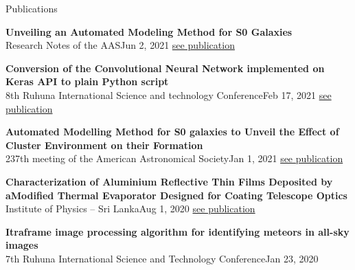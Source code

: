 \documentclass[
	11pt, %
]{./assets/resume} %
\begin{document}





\begin{rSection}{Publications}

	\textbf{Unveiling an Automated Modeling Method for S0 Galaxies} \\
	{Research Notes of the AAS}{Jun 2, 2021}
	\href{https://iopscience.iop.org/article/10.3847/2515-5172/ac0dc0}{see publication}

	\textbf{Conversion of the Convolutional Neural Network implemented on Keras API to plain Python script} \\
	{8th Ruhuna International Science and technology Conference}{Feb 17, 2021}
	\href{https://www.researchgate.net/publication/360994589_Conversion_of_the_Convolutional_Neural_Network_implemented_on_Keras_API_to_plain_Python_script}{see publication}

	\textbf{Automated Modelling Method for S0 galaxies to Unveil the Effect of Cluster Environment on their Formation} \\
	{237th meeting of the American Astronomical Society}{Jan 1, 2021}
	\href{https://www.researchgate.net/publication/348993949_Automated_Modelling_Method_for_S0_galaxies_to_Unveil_the_Effect_of_Cluster_Environment_on_their_Formation}{see publication}
	
	\textbf{Characterization of Aluminium Reflective Thin Films Deposited by aModified Thermal Evaporator Designed for Coating Telescope Optics} \\
	{Institute of Physics – Sri Lanka}{Aug 1, 2020}
	\href{https://www.researchgate.net/publication/344312143_Characterization_of_Aluminium_Reflective_Thin_Films_Deposited_by_a_Modified_Thermal_Evaporator_Designed_for_Coating_Telescope_Optics}{see publication}

	\textbf{Itraframe image processing algorithm for identifying meteors in all-sky images} \\
	{7th Ruhuna International Science and Technology Conference}{Jan 23, 2020}


\end{rSection}
\end{document}
